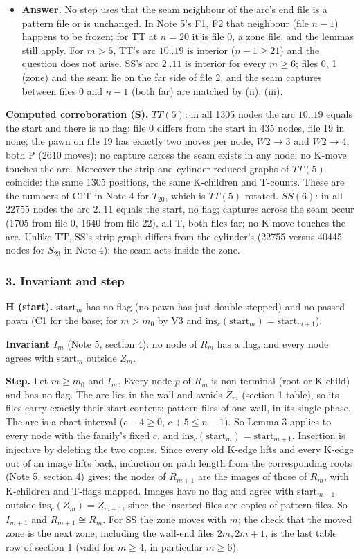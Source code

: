 \begin{itemize}
\item \textbf{Answer.} No step uses that the seam neighbour of the arc's end file is a pattern file or is unchanged. In Note 5's F1, F2 that neighbour (file $n-1$) happens to be frozen; for TT at $n=20$ it is file 0, a zone file, and the lemmas still apply. For $m>5$, TT's arc $10..19$ is interior ($n-1\ge21$) and the question does not arise. SS's arc $2..11$ is interior for every $m\ge6$; files 0, 1 (zone) and the seam lie on the far side of file 2, and the seam captures between files 0 and $n-1$ (both far) are matched by (ii), (iii).
\end{itemize}
\textbf{Computed corroboration (S).} $TT(5)$: in all 1305 nodes the arc $10..19$ equals the start and there is no flag; file 0 differs from the start in 435 nodes, file 19 in none; the pawn on file 19 has exactly two moves per node, $W2\to3$ and $W2\to4$, both P (2610 moves); no capture across the seam exists in any node; no K-move touches the arc. Moreover the strip and cylinder reduced graphs of $TT(5)$ coincide: the same 1305 positions, the same K-children and T-counts. These are the numbers of C1T in Note 4 for $T_{20}$, which is $TT(5)$ rotated. $SS(6)$: in all 22755 nodes the arc $2..11$ equals the start, no flag; captures across the seam occur (1705 from file 0, 1640 from file 22), all T, both files far; no K-move touches the arc. Unlike TT, SS's strip graph differs from the cylinder's (22755 versus 40445 nodes for $S_{23}$ in Note 4): the seam acts inside the zone.

\subsubsection*{3. Invariant and step}
\textbf{H (start).} $\mathrm{start}_m$ has no flag (no pawn has just double-stepped) and no passed pawn (C1 for the base; for $m>m_0$ by V3 and $\mathrm{ins}_c(\mathrm{start}_m)=\mathrm{start}_{m+1}$).

\textbf{Invariant $I_m$} (Note 5, section 4): no node of $R_m$ has a flag, and every node agrees with $\mathrm{start}_m$ outside $Z_m$.

\textbf{Step.} Let $m\ge m_0$ and $I_m$. Every node $p$ of $R_m$ is non-terminal (root or K-child) and has no flag. The arc lies in the wall and avoids $Z_m$ (section 1 table), so its files carry exactly their start content: pattern files of one wall, in its single phase. The arc is a chart interval ($c-4\ge0$, $c+5\le n-1$). So Lemma 3 applies to every node with the family's fixed $c$, and $\mathrm{ins}_c(\mathrm{start}_m)=\mathrm{start}_{m+1}$. Insertion is injective by deleting the two copies. Since every old K-edge lifts and every K-edge out of an image lifts back, induction on path length from the corresponding roots (Note 5, section 4) gives: the nodes of $R_{m+1}$ are the images of those of $R_m$, with K-children and T-flags mapped. Images have no flag and agree with $\mathrm{start}_{m+1}$ outside $\mathrm{ins}_c(Z_m)=Z_{m+1}$, since the inserted files are copies of pattern files. So $I_{m+1}$ and $R_{m+1}\cong R_m$. For SS the zone moves with $m$; the check that the moved zone is the next zone, including the wall-end files $2m,2m+1$, is the last table row of section 1 (valid for $m\ge4$, in particular $m\ge6$).

